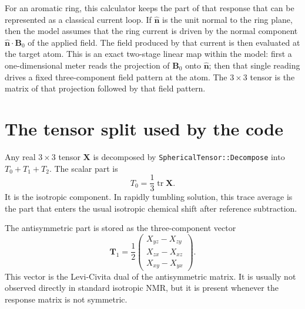 \documentclass[11pt]{article}
\begin{document}
For an aromatic ring, this calculator keeps the part of that response that can
be represented as a classical current loop. If \(\hat{\bm n}\) is the unit
normal to the ring plane, then the model assumes that the ring current is
driven by the normal component \(\hat{\bm n}\cdot\bm B_0\) of the applied
field. The field produced by that current is then evaluated at the target
atom. This is an exact two-stage linear map within the model: first a
one-dimensional meter reads the projection of \(\bm B_0\) onto
\(\hat{\bm n}\); then that single reading drives a fixed three-component field
pattern at the atom. The \(3\times3\) tensor is the matrix of that projection
followed by that field pattern.

\section{The tensor split used by the code}

Any real \(3\times3\) tensor \(\bm X\) is decomposed by
\texttt{SphericalTensor::Decompose} into \(T_0+T_1+T_2\). The scalar part is
\begin{equation}
  T_0=\frac{1}{3}\operatorname{tr}\bm X .
  \label{eq:t0}
\end{equation}
It is the isotropic component. In rapidly tumbling solution, this trace
average is the part that enters the usual isotropic chemical shift after
reference subtraction.

The antisymmetric part is stored as the three-component vector
\begin{equation}
  \bm T_1=\frac{1}{2}
  \begin{pmatrix}
    X_{yz}-X_{zy}\\
    X_{zx}-X_{xz}\\
    X_{xy}-X_{yx}
  \end{pmatrix}.
  \label{eq:t1}
\end{equation}
This vector is the Levi-Civita dual of the antisymmetric matrix. It is usually
not observed directly in standard isotropic NMR, but it is present whenever
the response matrix is not symmetric.
\end{document}

